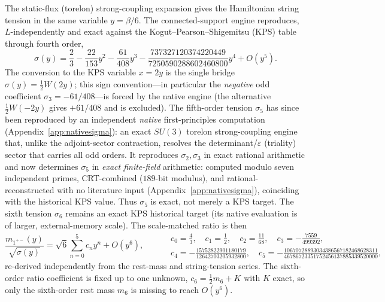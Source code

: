 \documentclass[11pt]{article}
\begin{document}
The static-flux (torelon) strong-coupling expansion gives the Hamiltonian string
tension in the same variable $y=\beta/6$. The connected-support engine reproduces,
$L$-independently and exact against the Kogut--Pearson--Shigemitsu (KPS) table
through fourth order,
\[
\sigma(y)=\frac23-\frac{22}{153}y^2-\frac{61}{408}y^3
-\frac{737327120374220449}{7250590288602460800}y^4+O(y^5).
\]
The conversion to the KPS variable $x=2y$ is the single bridge
$\sigma(y)=\tfrac12W(2y)$; this sign convention---in particular the \emph{negative}
odd coefficient $\sigma_3=-61/408$---is forced by the native engine (the alternative
$\tfrac12W(-2y)$ gives $+61/408$ and is excluded). The fifth-order tension $\sigma_5$
has since been reproduced by an independent \emph{native} first-principles computation
(Appendix~\ref{app:nativesigma}): an exact $SU(3)$ torelon strong-coupling engine that,
unlike the adjoint-sector contraction, resolves the determinant/$\varepsilon$ (triality)
sector that carries all odd orders. It reproduces $\sigma_2,\sigma_3$ in exact rational
arithmetic and now determines $\sigma_5$ in \emph{exact finite-field} arithmetic: computed
modulo seven independent primes, CRT-combined ($189$-bit modulus), and rational-reconstructed
with no literature input (Appendix~\ref{app:nativesigma}), coinciding with the historical KPS
value. Thus $\sigma_5$ is exact, not merely a KPS target. The sixth tension $\sigma_6$ remains an exact
KPS historical target (its native evaluation is of larger, external-memory scale). The scale-matched ratio is then
\begin{equation}
\frac{m_{1^{+-}}(y)}{\sqrt{\sigma(y)}}=\sqrt6\sum_{n=0}^{5}c_ny^n+O(y^6),
\qquad
\begin{aligned}
&c_0=\tfrac43,\quad c_1=\tfrac12,\quad c_2=\tfrac{11}{68},\quad
c_3=-\tfrac{7559}{499392},\\
&c_4=-\tfrac{15752822901180179}{12642703205932800},\quad
c_5=-\tfrac{10670728893034386567182468628311}{46786723351752456137885339520000},
\end{aligned}
\label{eq:ratio5}
\end{equation}
re-derived independently from the rest-mass and string-tension series. The
sixth-order ratio coefficient is fixed up to one unknown, $c_6=\tfrac12m_6+K$ with
$K$ exact, so only the sixth-order rest mass $m_6$ is missing to reach $O(y^6)$.
\end{document}
